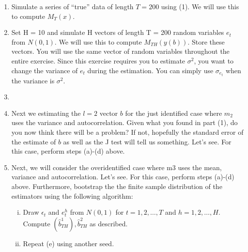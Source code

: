 \documentclass{article} %
\DeclareMathOperator*{\E}{\mathbb{E}} %
\theoremstyle{definition}
\newenvironment{solution}[1][Answer]{\begin{singlespace}\underline{\textbf{#1:}}\quad }{\ \rule{0.3em}{0.3em}\end{singlespace}} %
\begin{document}
\begin{enumerate}
\begin{solution}
			Both the variance and the first order correlation are informative for estimating $ b $. This is because we can estimate the true parameters given the two moments as follows
			\begin{align*}
				\rho_0 = \frac{ \E[(x_t - \E[x_t]) (x_{t-1} - \E[x_{t-1}]) ] }{ 	\E[(x_t - \E[x_t])^2]  } && \sigma^2 =  \E[(x_t - \E[x_t])^2] -  \frac{ \E[(x_t - \E[x_t]) (x_{t-1} - \E[x_{t-1}]) ] }{ 	\E[(x_t - \E[x_t])^2]  }
			\end{align*}
		\end{solution}
		\item Simulate a series of “true” data of length $ T = 200 $ using (1). We will use this to compute
		$ M_T (x) $.
		
		\item Set H = 10 and simulate H vectors of length T = 200 random variables $ e_t $ from $ N(0, 1) $. We will use this to compute $ M_{TH}(y(b)) $. Store these vectors. You will use the same vector of random variables throughout the entire exercise. Since this exercise requires you to estimate $ \sigma^2 $, you want to change the variance of $ e_t $ during the estimation. You can simply use $ \sigma_{e_t} $ when the variance is $ \sigma^2 $.
		
		\item 
		
		\item Next we estimating the $ l = 2 $ vector $ b $ for the just identified case where $ m_2 $ uses the variance and autocorrelation. Given what you found in part (1), do you now think there will be a problem? If not, hopefully the standard error of the estimate of $ b $ as well as the J test will tell us something. Let’s see. For this case, perform steps (a)-(d) above.
		
		\item Next, we will consider the overidentified case where m3 uses the mean, variance and autocorrelation. Let’s see. For this case, perform steps (a)-(d) above. Furthermore, bootstrap the the finite sample distribution of the estimators using the following algorithm:
		\begin{enumerate}[i.]
			\item Draw $ \epsilon_t $ and $ e_t^h $ from $ N(0,1) $ for $ t = 1,2,\hdots,T $ and $ h = 1,2,\hdots,H $. Compute $ (\hat{b}_{TH}^1), \hat{b}_{TH}^2 $ as described.
			
			\item Repeat (e) using another seed.
		\end{enumerate}
	
	\end{enumerate}
\end{document}
